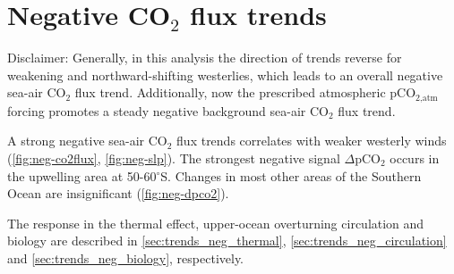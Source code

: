 \clearpage



\section{Negative CO$_2$ flux trends}
\label{sec:trends_neg}

Disclaimer: Generally, in this analysis the direction of trends reverse for weakening and northward-shifting westerlies, which leads to an overall negative sea-air CO$_2$ flux trend. Additionally, now the prescribed atmospheric pCO$_{\text{2,atm}}$ forcing promotes a steady negative background sea-air CO$_2$ flux trend.\newline

A strong negative sea-air CO$_2$ flux trends correlates with weaker westerly winds (\autoref{fig:neg-co2flux}, \ref{fig:neg-slp}). The strongest negative signal $\Delta$pCO$_2$ occurs in the upwelling area at 50-60$^\circ$S. Changes in most other areas of the Southern Ocean are insignificant (\autoref{fig:neg-dpco2}). 


The response in the thermal effect, upper-ocean overturning circulation and biology are described in \autoref{sec:trends_neg_thermal}, \ref{sec:trends_neg_circulation} and \ref{sec:trends_neg_biology}, respectively.

